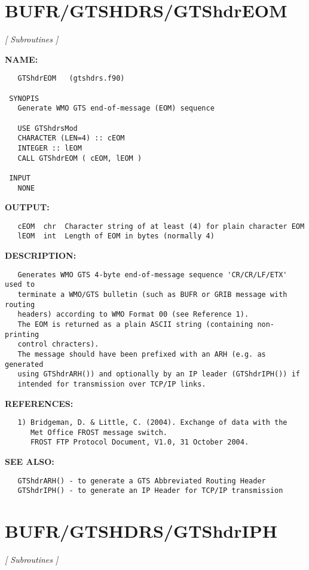 \section{BUFR/GTSHDRS/GTShdrEOM}
\textsl{[ Subroutines ]}

\label{ch:robo10}
\label{ch:BUFR_GTSHDRS_GTShdrEOM}
\textbf{NAME:}\hspace{0.08in}\begin{Verbatim}
   GTShdrEOM   (gtshdrs.f90)

 SYNOPIS
   Generate WMO GTS end-of-message (EOM) sequence

   USE GTShdrsMod
   CHARACTER (LEN=4) :: cEOM
   INTEGER :: lEOM
   CALL GTShdrEOM ( cEOM, lEOM )

 INPUT
   NONE
\end{Verbatim}
\textbf{OUTPUT:}\hspace{0.08in}\begin{Verbatim}
   cEOM  chr  Character string of at least (4) for plain character EOM
   lEOM  int  Length of EOM in bytes (normally 4)
\end{Verbatim}
\textbf{DESCRIPTION:}\hspace{0.08in}\begin{Verbatim}
   Generates WMO GTS 4-byte end-of-message sequence 'CR/CR/LF/ETX' used to
   terminate a WMO/GTS bulletin (such as BUFR or GRIB message with routing
   headers) according to WMO Format 00 (see Reference 1).
   The EOM is returned as a plain ASCII string (containing non-printing
   control chracters).
   The message should have been prefixed with an ARH (e.g. as generated
   using GTShdrARH()) and optionally by an IP leader (GTShdrIPH()) if
   intended for transmission over TCP/IP links.
\end{Verbatim}
\textbf{REFERENCES:}\hspace{0.08in}\begin{Verbatim}
   1) Bridgeman, D. & Little, C. (2004). Exchange of data with the
      Met Office FROST message switch.
      FROST FTP Protocol Document, V1.0, 31 October 2004.
\end{Verbatim}
\textbf{SEE ALSO:}\hspace{0.08in}\begin{Verbatim}
   GTShdrARH() - to generate a GTS Abbreviated Routing Header
   GTShdrIPH() - to generate an IP Header for TCP/IP transmission
\end{Verbatim}
\section{BUFR/GTSHDRS/GTShdrIPH}
\textsl{[ Subroutines ]}

